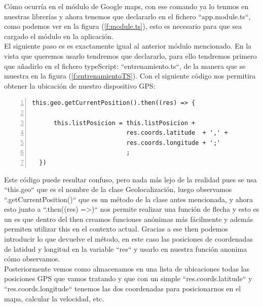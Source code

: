 \documentclass[a4paper, 11pt]{article}
\begin{document}
\begin{itemize}
                Cómo ocurría en el módulo de Google maps, con ese comando ya lo
                tenmos en nuestras librerías y ahora tenemos que
                declararlo en el fichero ``app.module.ts``, como podemos ver en
                la figura (\ref{f:module.ts}), esto es necesario para que sea
                cargado el módulo en la aplicación.\\

                El siguiente paso es es exactamente igual al anterior módulo
                mencionado. En la vista que queremos
                usarlo tendremos que declararlo, para ello tendremos primero que
                añadirlo en el fichero
                typeScript: ``entrenamiento.ts``, de la manera que se muestra en
                la figura (\ref{f:entrenamientoTS}). Con el siguiente código nos
                permitira obtener la ubicación de nuestro dispositivo GPS:\\

                \begin{lstlisting}[frame=single,numbers=left, numberstyle=\tiny, stepnumber=1, numbersep=-2pt]
  this.geo.getCurrentPosition().then((res) => {

      this.listPosicion = this.listPosicion +
                          res.coords.latitude  + ',' +
                          res.coords.longitude + ';'
                          ;
  })
                \end{lstlisting}


                Este código puede resultar confuso, pero nada más lejo de la realidad
                pues se usa ``this.geo`` que es el nombre de la clase Geolocalización,
                luego observamos ``.getCurrentPosition()`` que es un método de
                la clase antes mencionada, y ahora esto junto a ``.then((res) =>{})``
                nos permite realizar una función de flecha y esto es un es que
                dentro del then creamos funciones anónimas más fácilmente y
                además permiten utilizar this en el contexto actual. Gracias a
                ese then podemos introducir lo que devuelve el método, en este
                caso las posiciones de coordenadas de latidud y longitud en la
                variable ``res`` y usarlo en nuestra función anonima cómo
                observamos.\\

                Posteriormente vemos como almacenamos en una lista de ubicaciones
                todas las posiciones GPS que vamos tratando y que con un simple
                ``res.coords.latitude`` y ``res.coords.longitude`` tenemos las
                dos coordenadas para posicionarnos en el mapa, calcular la velocidad, etc.\\



\end{itemize}
\end{document}
